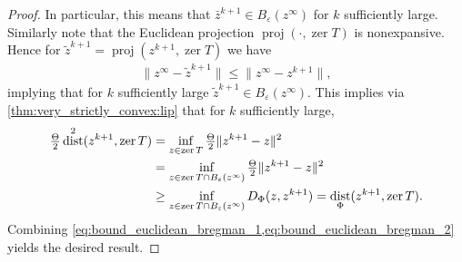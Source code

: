 \documentclass[11pt,onecolumn]{article}
\DeclareMathOperator{\proj}{proj}
\DeclareMathOperator{\zer}{zer}
\DeclareMathOperator{\dist}{dist}
\theoremstyle{remark}
\begin{document}
\begin{proof}
    In particular, this means that $\bar z^{k+1} \in B_\varepsilon(z^\infty)$ for $k$ sufficiently large.
    Similarly note that the Euclidean projection $\proj(\cdot, \zer T)$ is nonexpansive. Hence for $\tilde{z}^{k+1}=\proj(z^{k+1}, \zer T)$ we have
\begin{align}
    \|z^\infty-\tilde{z}^{k+1}\| \leq \|z^\infty-z^{k+1}\|,
\end{align}
implying that for $k$ sufficiently large $\tilde{z}^{k+1}\in B_\varepsilon(z^\infty)$. 
    This implies via \cref{thm:very_strictly_convex:lip} that for $k$ sufficiently large,
    \begin{align} \label{eq:bound_euclidean_bregman_2}
    \tfrac{\Theta}{2}\dist^2(z^{k+1}, \zer T) &= \inf_{z \in \zer T} \tfrac{\Theta}{2}\|z^{k+1} - z\|^2 \notag \\
    &= \inf_{z \in \zer T\cap B_\varepsilon(z^\infty)} \tfrac{\Theta}{2}\|z^{k+1} - z\|^2 \notag \\
    &\geq \inf_{z \in \zer T\cap B_\varepsilon(z^\infty)} D_\Phi(z, z^{k+1}) = \dist_\Phi(z^{k+1}, \zer T).
    \end{align}
    Combining \cref{eq:bound_euclidean_bregman_1,eq:bound_euclidean_bregman_2} yields the desired result.
\end{proof}
\end{document}
